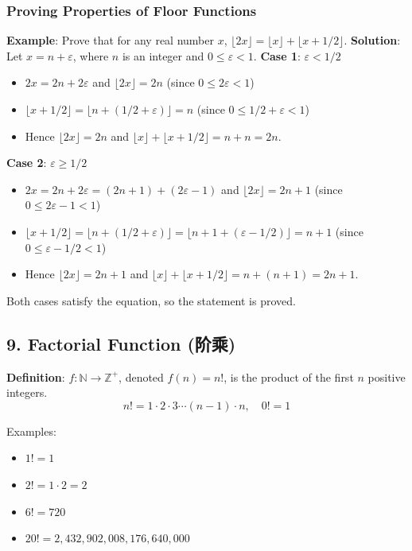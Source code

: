 \documentclass[10pt,a4paper,openany]{ctexbook}
\theoremstyle{definition}
\theoremstyle{remark}
\begin{document}
\subsubsection{Proving Properties of Floor Functions}

\textbf{Example}: Prove that for any real number $x$, $\lfloor 2x \rfloor = \lfloor x \rfloor + \lfloor x + 1/2 \rfloor$.
\textbf{Solution}: Let $x = n + \varepsilon$, where $n$ is an integer and $0 \le \varepsilon < 1$.
\textbf{Case 1}: $\varepsilon < 1/2$
\begin{itemize}
\item $2x = 2n + 2\varepsilon$ and $\lfloor 2x \rfloor = 2n$ (since $0 \le 2\varepsilon < 1$)
\item $\lfloor x + 1/2 \rfloor = \lfloor n + (1/2 + \varepsilon) \rfloor = n$ (since $0 \le 1/2 + \varepsilon < 1$)
\item Hence $\lfloor 2x \rfloor = 2n$ and $\lfloor x \rfloor + \lfloor x + 1/2 \rfloor = n + n = 2n$.

\end{itemize}

\textbf{Case 2}: $\varepsilon \ge 1/2$
\begin{itemize}
\item $2x = 2n + 2\varepsilon = (2n + 1) + (2\varepsilon - 1)$ and $\lfloor 2x \rfloor = 2n + 1$ (since $0 \le 2\varepsilon - 1 < 1$)
\item $\lfloor x + 1/2 \rfloor = \lfloor n + (1/2 + \varepsilon) \rfloor = \lfloor n + 1 + (\varepsilon - 1/2) \rfloor = n + 1$ (since $0 \le \varepsilon - 1/2 < 1$)
\item Hence $\lfloor 2x \rfloor = 2n + 1$ and $\lfloor x \rfloor + \lfloor x + 1/2 \rfloor = n + (n + 1) = 2n + 1$.

\end{itemize}

Both cases satisfy the equation, so the statement is proved.
\vspace{-2pt}

\subsection{9. Factorial Function (阶乘)}

\textbf{Definition}: $f: \mathbb{N} \to \mathbb{Z}^+$, denoted $f(n) = n!$, is the product of the first $n$ positive integers.
\[
n! = 1 \cdot 2 \cdot 3 \cdots (n-1) \cdot n, \quad 0! = 1
\]

Examples:
\begin{itemize}
\item $1! = 1$
\item $2! = 1 \cdot 2 = 2$
\item $6! = 720$
\item $20! = 2,432,902,008,176,640,000$

\end{itemize}
\end{document}
